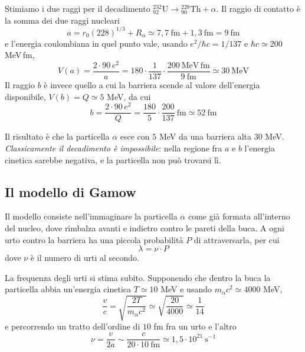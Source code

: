 Stimiamo i due raggi per il decadimento $^{232}_{92}\mathrm{U} \to {}^{228}_{90}\mathrm{Th} + \alpha$. Il raggio di contatto è la somma dei due raggi nucleari
%
\begin{equation*}
    a = r_0 (228)^{1/3} + R_\alpha \simeq 7,7 \ \mathrm{fm} + 1,3 \ \mathrm{fm} = 9 \ \mathrm{fm}
\end{equation*}
e l'energia coulombiana in quel punto vale, usando $e^2/\hbar c = 1/137$ e $\hbar c \simeq 200$ MeV\,fm,
%
\begin{equation*}
    V(a) = \frac{2 \cdot 90 \, e^2}{a} = 180 \cdot \frac{1}{137}\cdot\frac{200 \ \mathrm{MeV \, fm}}{9 \ \mathrm{fm}} \simeq 30 \ \mathrm{MeV}
\end{equation*}
Il raggio $b$ è invece quello a cui la barriera scende al valore dell'energia disponibile, $V(b) = Q \simeq 5$ MeV, da cui
%
\begin{equation*}
    b = \frac{2\cdot 90 \, e^2}{Q} = \frac{180}{5}\cdot\frac{200}{137} \ \mathrm{fm} \simeq 52 \ \mathrm{fm}
\end{equation*}

Il risultato è che la particella $\alpha$ esce con $5$ MeV da una barriera alta $30$ MeV. \emph{Classicamente il decadimento è impossibile}: nella regione fra $a$ e $b$ l'energia cinetica sarebbe negativa, e la particella non può trovarsi lì.

\subsection{Il modello di Gamow}

Il modello consiste nell'immaginare la particella $\alpha$ come già formata all'interno del nucleo, dove rimbalza avanti e indietro contro le pareti della buca. A ogni urto contro la barriera ha una piccola probabilità $P$ di attraversarla, per cui
%
\begin{equation}
    \lambda = \nu \cdot P
\end{equation}
dove $\nu$ è il numero di urti al secondo.

La frequenza degli urti si stima subito. Supponendo che dentro la buca la particella abbia un'energia cinetica $T \simeq 10$ MeV e usando $m_\alpha c^2 \simeq 4000$ MeV,
%
\begin{equation*}
    \frac{v}{c} = \sqrt{\frac{2T}{m_\alpha c^2}} \simeq \sqrt{\frac{20}{4000}} \simeq \frac{1}{14}
\end{equation*}
e percorrendo un tratto dell'ordine di $10$ fm fra un urto e l'altro
%
\begin{equation}
    \nu = \frac{v}{2a} \sim \frac{c}{20 \cdot 10 \ \mathrm{fm}} \simeq 1,5 \cdot 10^{21} \ \mathrm{s}^{-1}
\end{equation}

